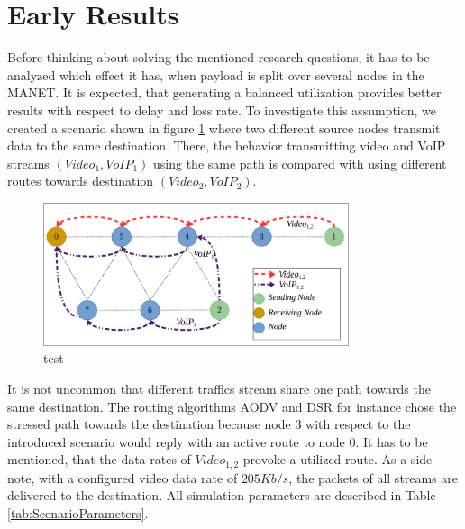 \documentclass[runningheads]{llncs}
\newcommand{\MANET}{MANET}
\newcommand{\VOIP}{VoIP}
\begin{document}
	\section{Early Results}
	Before thinking about solving the mentioned research questions, it has to be analyzed which effect it has, when payload is split over several nodes in the \MANET{}. It is expected, that generating a balanced utilization provides better results with respect to delay and loss rate.
	To investigate this assumption, we created a scenario shown in figure \ref{fig:ScenarioBoth} where two different source nodes transmit data to the same destination. There, the behavior transmitting video and \VOIP{} streams $(Video_1,\VOIP{}_1)$ using the same path is compared with using different routes towards destination $(Video_2,\VOIP{}_2)$.
	\begin{figure}[h]
		\centering
		\includegraphics[width=0.8\textwidth]{figures/ScenarioBoth.pdf}
		\caption{test}
		\label{fig:ScenarioBoth}
	\end{figure}
	It is not uncommon that different traffics stream share one path towards the same destination. The routing algorithms AODV \cite{EvaluationAODV} and DSR \cite{Evaluation:DSR} for instance chose the stressed path towards the destination because node $3$ with respect to the introduced scenario would reply with an active route to node $0$. It has to be mentioned, that the data rates of $Video_{1,2}$ provoke a utilized route. As a side note, with a configured video data rate of $205Kb/s$, the packets of all streams are delivered to the destination. All simulation parameters are described in Table \ref{tab:ScenarioParameters}.
\end{document}
